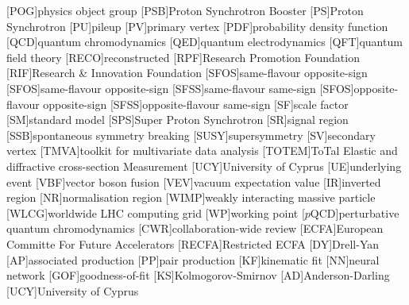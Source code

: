 \begin{acronym}
  [POG]{physics object group}
  [PSB]{Proton Synchrotron Booster}
  [PS]{Proton Synchrotron}
  [PU]{pileup}
  [PV]{primary vertex}
  [PDF]{probability density function}
  [QCD]{quantum chromodynamics}
  [QED]{quantum electrodynamics}
  [QFT]{quantum field theory}
  [RECO]{reconstructed}
  [RPF]{Research Promotion Foundation}
  [RIF]{Research \& Innovation Foundation}
  [SFOS]{same-flavour opposite-sign}
  [SFOS]{same-flavour opposite-sign}
  [SFSS]{same-flavour same-sign}
  [SFOS]{opposite-flavour opposite-sign}
  [SFSS]{opposite-flavour same-sign}
  [SF]{scale factor}
  [SM]{standard model}
  [SPS]{Super Proton Synchrotron}
  [SR]{signal region}
  [SSB]{spontaneous symmetry breaking}
  [SUSY]{supersymmetry}
  [SV]{secondary vertex}
  [TMVA]{toolkit for multivariate data analysis}
  [TOTEM]{ToTal Elastic and diffractive cross-section Measurement}
  [UCY]{University of Cyprus}
  [UE]{underlying event}
  [VBF]{vector boson fusion}
  [VEV]{vacuum expectation value}
  [IR]{inverted region}
  [NR]{normalisation region}
  [WIMP]{weakly interacting massive particle}
  [WLCG]{worldwide LHC computing grid}
  [WP]{working point}
  [$p$QCD]{perturbative quantum chromodynamics}
  [CWR]{collaboration-wide review}
  [ECFA]{European Committe For Future Accelerators} %
  [RECFA]{Restricted \ac{ECFA}}
  [DY]{Drell-Yan}
  [AP]{associated production}
  [PP]{pair production}
  [KF]{kinematic fit}
  [NN]{neural network}
  [GOF]{goodness-of-fit}
  [KS]{Kolmogorov-Smirnov}
  [AD]{Anderson-Darling}
  [UCY]{University of Cyprus}  
\end{acronym}

